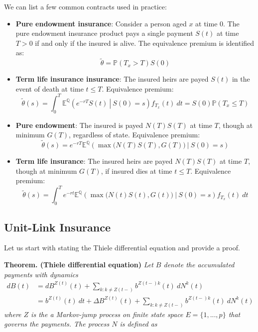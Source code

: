\documentclass[
]{book}
\providecommand{\tightlist}{%
  \setlength{\itemsep}{0pt}\setlength{\parskip}{0pt}}
\begin{document}
We can list a few common contracts used in practice:

\begin{itemize}
\tightlist
\item
  \textbf{Pure endowment insurance}: Consider a person aged \(x\) at time \(0\). The pure endowment insurance product pays a single payment \(S(t)\) at time \(T>0\) if and only if the insured is alive. The equivalence premium is identified as:
  \[\tilde\theta =\mathbb P(T_x> T)S(0)\]
\item
  \textbf{Term life insurance insurance}: The insured heirs are payed \(S(t)\) in the event of death at time \(t\le T\). Equivalence premium:
  \[\tilde\theta(s) =\int_0^T\mathbb E^{\mathbb Q}\left(\left.e^{-rT}S(t)\ \right\vert\ S(0)=s\right)f_{T_x}(t)\ dt=S(0)\mathbb P(T_x\le T)\]
\item
  \textbf{Pure endowment}: The insured is payed \(N(T)S(T)\) at time \(T\), though at minimum \(G(T)\), regardless of state. Equivalence premium:
  \[\tilde\theta(s) =e^{-rT}\mathbb E^{\mathbb Q}\left(\left.\max\Big(N(T)S(T),G(T)\Big) \ \right\vert\ S(0)=s\right)\]
\item
  \textbf{Term life insurance}: The insured heirs are payed \(N(T)S(T)\) at time \(T\), though at minimum \(G(T)\), if insured dies at time \(t\le T\). Equivalence premium:
  \[\tilde\theta(s) =\int_0^Te^{-rt}\mathbb E^{\mathbb Q}\left(\left.\max\Big(N(t)S(t),G(t)\Big) \ \right\vert\ S(0)=s\right)f_{T_x}(t)\ dt\]
\end{itemize}

\hypertarget{unit-link-insurance}{%
\subsection{Unit-Link Insurance}\label{unit-link-insurance}}

Let us start with stating the Thiele differential equation and provide a proof.

\textbf{Theorem. (Thiele differential equation)} \emph{Let \(B\) denote the accumulated payments with dynamics}
\begin{align*}
dB(t)&=dB^{Z(t)}(t)+\sum_{k:k\ne Z(t-)}b^{Z(t-)k}(t)\ dN^k(t)\\
&=b^{Z(t)}(t)\ dt+\Delta B^{Z(t)}(t)+\sum_{k:k\ne Z(t-)}b^{Z(t-)k}(t)\ dN^k(t)
\end{align*}
\emph{where \(Z\) is the a Markov-jump process on finite state space \(E=\{1,...,p\}\) that governs the payments. The process \(N\) is defined as}
\end{document}
